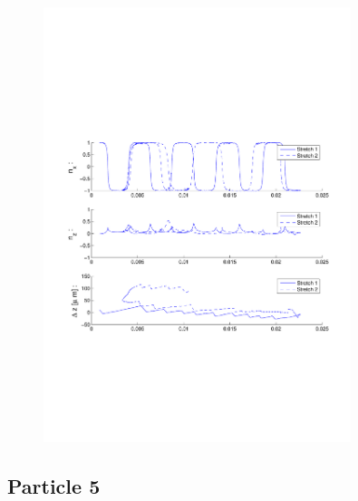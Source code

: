 \begin{figure}[H]

\centering

\includegraphics[width=0.8\textwidth]{Images/Particle 3/Stretch1.pdf}

\end{figure}


\subsection{Particle 5}

